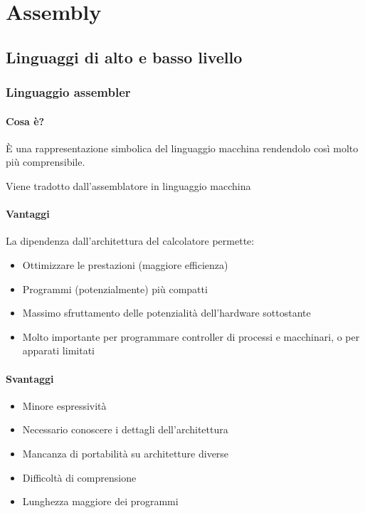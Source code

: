 \chapter{Assembly}
\section{Linguaggi di alto e basso livello}
\subsection{Linguaggio assembler}
\subsubsection{Cosa è?}
È una rappresentazione simbolica del linguaggio macchina rendendolo così molto più comprensibile.

Viene tradotto dall'assemblatore in linguaggio macchina

\subsubsection{Vantaggi}
La dipendenza dall'architettura del calcolatore permette:
\begin{itemize}
    \item Ottimizzare le prestazioni (maggiore efficienza)
    \item Programmi (potenzialmente) più compatti
    \item Massimo sfruttamento delle potenzialità dell'hardware sottostante
    \item Molto importante per programmare controller di processi  e macchinari, o per apparati limitati
\end{itemize}

\subsubsection{Svantaggi}

\begin{itemize}
    \item Minore espressività
    \item Necessario conoscere i dettagli dell'architettura
    \item Mancanza di portabilità su architetture diverse
    \item Difficoltà di comprensione
    \item Lunghezza maggiore dei programmi
\end{itemize}

